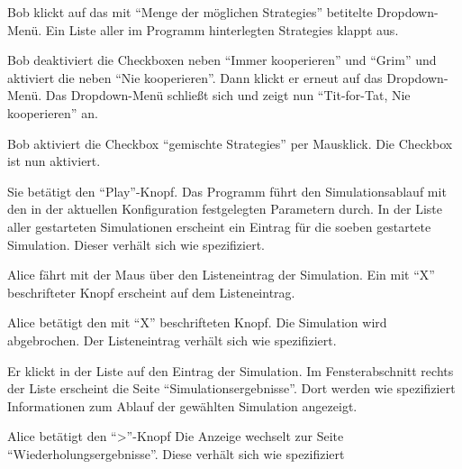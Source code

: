 \documentclass[parskip=full,11pt]{scrartcl}
\begin{document}
{Bob klickt auf das mit \enquote{Menge der möglichen \Glspl{Strategie}} betitelte Dropdown-Menü.}
{Ein Liste aller im Programm hinterlegten \Glspl{Strategie} klappt aus.}

{Bob deaktiviert die Checkboxen neben \enquote{Immer kooperieren} und \enquote{Grim} und aktiviert die neben \enquote{Nie kooperieren}. Dann klickt er erneut auf das Dropdown-Menü.}
{Das Dropdown-Menü schließt sich und zeigt nun \enquote{Tit-for-Tat, Nie kooperieren} an.}

{Bob aktiviert die Checkbox \enquote{\glspl{gemischte Strategie}} per Mausklick.}
{Die Checkbox ist nun aktiviert.}


{Sie betätigt den \enquote{Play}-Knopf.}
{Das Programm führt den Simulationsablauf mit den in der aktuellen Konfiguration festgelegten Parametern durch. In der Liste aller gestarteten Simulationen erscheint ein Eintrag für die soeben gestartete Simulation. Dieser verhält sich wie spezifiziert.}

{Alice fährt mit der Maus über den Listeneintrag der Simulation.}
{Ein mit \enquote{X} beschrifteter Knopf erscheint auf dem Listeneintrag.}

{Alice betätigt den mit \enquote{X} beschrifteten Knopf.}
{Die Simulation wird abgebrochen. Der Listeneintrag verhält sich wie spezifiziert.}

{Er klickt in der Liste auf den Eintrag der Simulation.}
{Im Fensterabschnitt rechts der Liste erscheint die Seite \enquote{Simulationsergebnisse}. Dort werden wie spezifiziert Informationen zum Ablauf der gewählten Simulation angezeigt.}

{Alice betätigt den \enquote{>}-Knopf}
{Die Anzeige wechselt zur Seite \enquote{Wiederholungsergebnisse}. Diese verhält sich wie spezifiziert}
\end{document}
